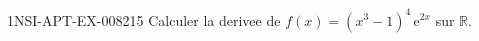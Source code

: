 \begin{exercice}{1NSI-APT-EX-008}{2}{15}
Calculer la derivee de $f(x) = (x^3 - 1)^4 \, \mathrm{e}^{2x}$ sur $\mathbb{R}$.

\end{exercice}
